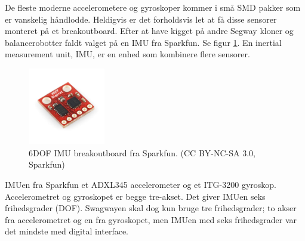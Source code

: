 \documentclass[a4paper,11pt,oneside,article,danish,table]{memoir}
\begin{document}
De fleste moderne accelerometere og gyroskoper kommer i små SMD pakker som er vanskelig håndlodde. Heldigvis er det forholdsvis let at få disse sensorer monteret på et breakoutboard. Efter at have kigget på andre Segway kloner og balancerobotter faldt valget på en IMU fra Sparkfun. Se figur \ref{fig:imu}. En inertial measurement unit, IMU, er en enhed som kombinere flere sensorer.
\begin{figure}[htbp]
  \centering
  \includegraphics[width=0.3\textwidth]{pictures/imu.jpg}
  \caption[6DOF IMU breakoutboard fra Sparkfun]{6DOF IMU breakoutboard fra Sparkfun. (CC BY-NC-SA 3.0, Sparkfun)}
  \label{fig:imu}
\end{figure}
IMUen fra Sparkfun et ADXL345 accelerometer og et ITG-3200 gyroskop. Accelerometret og gyroskopet er begge tre-akset.  Det giver IMUen seks frihedsgrader (DOF). Swagwayen skal dog kun bruge tre frihedsgrader; to akser fra accelerometret og en fra gyroskopet, men IMUen med seks frihedsgrader var det mindste med digital interface.
\end{document}
